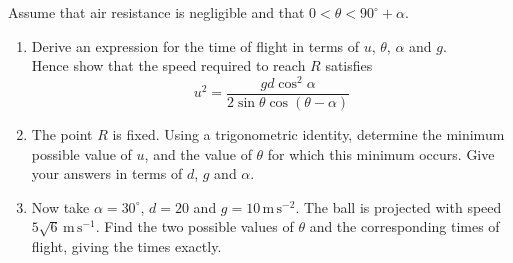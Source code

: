 \documentclass[leqno]{article}
\begin{document}
\begin{enumerate}[
  label=\textbf{\arabic*.},
  leftmargin=*,
  topsep=0pt,
  partopsep=0pt,
  parsep=0pt
]
Assume that air resistance is negligible and that $0<\theta<90^\circ+\alpha$. \\

\begin{enumerate}[label=\textbf{(\alph*)}]
\item Derive an expression for the time of flight in terms of $u$, $\theta$, $\alpha$ and $g$. \\
Hence show that the speed required to reach $R$ satisfies
\[
u^2=\frac{gd\cos^2\alpha}{2\sin\theta\cos(\theta-\alpha)}
\] 
\item The point $R$ is fixed. Using a trigonometric identity, determine the minimum possible value of $u$, and the value of $\theta$ for which this minimum occurs. Give your answers in terms of $d$, $g$ and $\alpha$.  \\
\item Now take $\alpha=30^\circ$, $d=20$ and $g=10\,\mathrm{m\,s^{-2}}$. The ball is projected with speed $5\sqrt{6}\,\mathrm{m\,s^{-1}}$. Find the two possible values of $\theta$ and the corresponding times of flight, giving the times exactly.  \\
\end{enumerate}

\end{enumerate}
\end{document}
